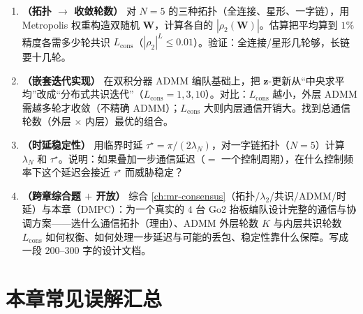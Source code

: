 \begin{exercise}
\begin{enumerate}
  \item \textbf{（拓扑 $\to$ 收敛轮数）} 对 $N=5$ 的三种拓扑（全连接、星形、一字链），用 Metropolis 权重构造双随机 $\mathbf{W}$，计算各自的 $|\rho_2(\mathbf{W})|$。估算把平均算到 $1\%$ 精度各需多少轮共识 $L_{\text{cons}}$（$|\rho_2|^L\le0.01$）。验证：全连接/星形几轮够，长链要十几轮。
  \item \textbf{（嵌套迭代实现）} 在双积分器 ADMM 编队基础上，把 $\mathbf{z}$-更新从“中央求平均”改成“分布式共识迭代”（$L_{\text{cons}}=1,3,10$）。对比：$L_{\text{cons}}$ 越小，外层 ADMM 需越多轮才收敛（不精确 ADMM）；$L_{\text{cons}}$ 大则内层通信开销大。找到总通信轮数（外层 $\times$ 内层）最优的组合。
  \item \textbf{（时延稳定性）} 用临界时延 $\tau^\star=\pi/(2\lambda_N)$，对一字链拓扑（$N=5$）计算 $\lambda_N$ 和 $\tau^\star$。说明：如果叠加一步通信延迟（$=$ 一个控制周期），在什么控制频率下这个延迟会接近 $\tau^\star$ 而威胁稳定？
  \item \textbf{（跨章综合题 $+$ 开放）} 综合 \cref{ch:mr-consensus}（拓扑/$\lambda_2$/共识/ADMM/时延）与本章（DMPC）：为一个真实的 $4$ 台 Go2 抬板编队设计完整的通信与协调方案——选什么通信拓扑（理由）、ADMM 外层轮数 $K$ 与内层共识轮数 $L_{\text{cons}}$ 如何权衡、如何处理一步延迟与可能的丢包、稳定性靠什么保障。写成一段 $200$–$300$ 字的设计文档。
\end{enumerate}
\end{exercise}

\section*{本章常见误解汇总}
\label{sec:dmpc-misconceptions}

